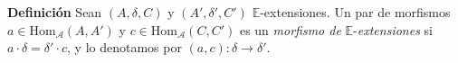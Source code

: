 \documentclass[preview]{standalone}
\begin{document}
\begin{center}
\begin{flushleft} \textbf{Definición} Sean $(A,\delta,C)$ y $(A',\delta',C')$ $\mathbb{E}$-extensiones. Un par de morfismos $a\in\text{Hom}_\mathscr{A}(A,A')$ y $c\in\text{Hom}_\mathscr{A}(C,C')$ es un \emph{morfismo de} $\mathbb{E}$-\emph{extensiones} si $a\cdot\delta = \delta'\cdot c$, y lo denotamos por $(a,c):\delta\to\delta'$. \end{flushleft}
\end{center}
\end{document}
